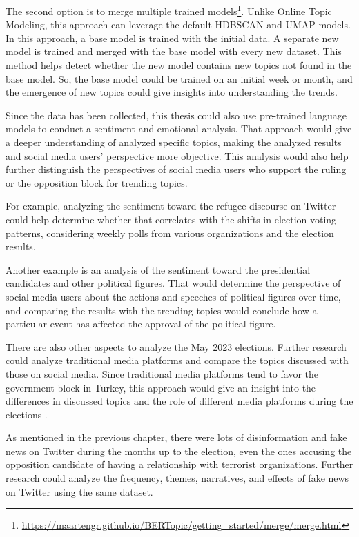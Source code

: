The second option is to merge multiple trained 
models\footnote{\url{https://maartengr.github.io/BERTopic/getting_started/merge/merge.html}}. Unlike 
Online Topic Modeling, this approach can leverage the default HDBSCAN and UMAP models. In this 
approach, a base model is trained with the initial data. A separate new model is trained and 
merged with the base model with every new dataset. This method helps detect whether the new model 
contains new topics not found in the base model. So, the base model could be trained on an 
initial week or month, and the emergence of new topics could give insights into understanding the 
trends.  

Since the data has been collected, this thesis could also use pre-trained language models to 
conduct a sentiment and emotional analysis. That approach would give a deeper understanding of 
analyzed specific topics, making the analyzed results and social media users' perspective more 
objective. This analysis would also help further distinguish the perspectives of social media users 
who support the ruling or the opposition block for trending topics. 

For example, analyzing the sentiment toward the refugee discourse on Twitter could help determine 
whether that correlates with the shifts in election voting patterns, considering weekly polls 
from various organizations and the election results.

Another example is an analysis of the sentiment toward the presidential candidates and other 
political figures. That would determine the perspective of social media users about the actions 
and speeches of political figures over time, and comparing the results with the trending topics 
would conclude how a particular event has affected the approval of the political figure.

There are also other aspects to analyze the May 2023 elections. Further research could analyze 
traditional media platforms and compare the topics discussed with those on social media. Since 
traditional media platforms tend to favor the government block in Turkey, this approach would 
give an insight into the differences in discussed topics and the role of different media platforms 
during the elections \parencite{freedom-house_turkey_report}. 

As mentioned in the previous chapter, there were lots of disinformation and fake news on Twitter 
during the months up to the election, even the ones accusing the opposition candidate of having a 
relationship with terrorist organizations. Further research could analyze the frequency, themes, 
narratives, and effects of fake news on Twitter using the same dataset.


